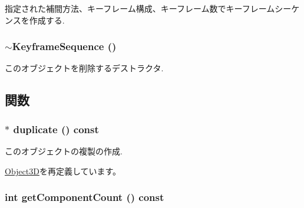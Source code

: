 指定された補間方法、キーフレーム構成、キーフレーム数でキーフレームシーケンスを作成する. \hypertarget{classm3g_1_1KeyframeSequence_464f5929e3302c788ca626c11ca8d656}{
\subsubsection[{$\sim$KeyframeSequence}]{\setlength{\rightskip}{0pt plus 5cm}$\sim${\bf KeyframeSequence} ()}}
\label{classm3g_1_1KeyframeSequence_464f5929e3302c788ca626c11ca8d656}


このオブジェクトを削除するデストラクタ. 

\subsection{関数}
\hypertarget{classm3g_1_1KeyframeSequence_f925b7c3107b6cdba08dbb045b203b4f}{
\subsubsection[{duplicate}]{ $\ast$ duplicate () const}}
\label{classm3g_1_1KeyframeSequence_f925b7c3107b6cdba08dbb045b203b4f}


このオブジェクトの複製の作成. 

\hyperlink{classm3g_1_1Object3D_a25110dac934f867b83b73ad4741a0f4}{Object3D}を再定義しています。\hypertarget{classm3g_1_1KeyframeSequence_7016f51d2788e78fdd736efd040f5e5e}{
\subsubsection[{getComponentCount}]{\setlength{\rightskip}{0pt plus 5cm}int getComponentCount () const}}
\label{classm3g_1_1KeyframeSequence_7016f51d2788e78fdd736efd040f5e5e}


